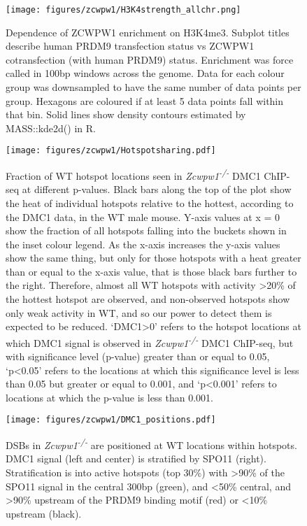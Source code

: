 \begin{figure}[H]
	\centering
	\texttt{[image: figures/zcwpw1/H3K4strength\_allchr.png]}
	\caption[Relative H3K4me3 Strength]{
		Dependence of ZCWPW1 enrichment on H3K4me3.
		Subplot titles describe human PRDM9 transfection status vs ZCWPW1 cotransfection (with human PRDM9) status.
		Enrichment was force called in 100bp windows across the genome.
		Data for each colour group was downsampled to have the same number of data points per group.
		Hexagons are coloured if at least 5 data points fall within that bin.
		Solid lines show density contours estimated by MASS::kde2d() in R.
	}
	\label{fig:H3K4strength_denisty}
\end{figure}


\begin{figure}[H]
	\centering
	\texttt{[image: figures/zcwpw1/Hotspotsharing.pdf]}
	\caption[Hotspot Sharing]{
		Fraction of WT hotspot locations seen in \textit{Zcwpw1\textsuperscript{-/-}} DMC1 ChIP-seq at different p-values.
		Black bars along the top of the plot show the heat of individual hotspots relative to the hottest, according to the DMC1 data, in the WT male mouse.
		Y-axis values at x = 0 show the fraction of all hotspots falling into the buckets shown in the inset colour legend.
		As the x-axis increases the y-axis values show the same thing, but only for those hotspots with a heat greater than or equal to the x-axis value, that is those black bars further to the right.
		Therefore, almost all WT hotspots with activity >20\% of the hottest hotspot are observed, and non-observed hotspots show only weak activity in WT, and so our power to detect them is expected to be reduced.
		`DMC1>0' refers to the hotspot locations at which DMC1 signal is observed in \textit{Zcwpw1\textsuperscript{-/-}} DMC1 ChIP-seq, but with significance level (p-value) greater than or equal to 0.05, `p<0.05' refers to the locations at which this significance level is less than 0.05 but greater or equal to 0.001, and `p<0.001' refers to locations at which the p-value is less than 0.001.
	}
	\label{fig:hotspotsharing}
\end{figure}


\begin{figure}[H]
	\centering
	\texttt{[image: figures/zcwpw1/DMC1\_positions.pdf]}
	\caption[DMC1 positions]{
		DSBs in \textit{Zcwpw1\textsuperscript{-/-}} are positioned at WT locations within hotspots.
		DMC1 signal (left and center) is stratified by SPO11 (right).
		Stratification is into active hotspots (top 30\%) with >90\% of the SPO11 signal in the central 300bp (green), and <50\% central, and >90\% upstream of the PRDM9 binding motif (red) or <10\% upstream (black).
	}
	\label{fig:DMC1_positions}
\end{figure}


